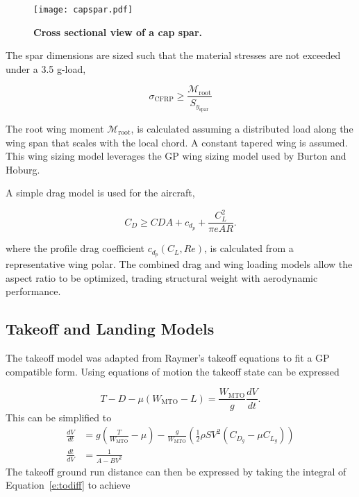 \documentclass[]{aiaa-tc}%
\begin{document}
\begin{figure}[h!]
	\begin{center}
	\texttt{[image: capspar.pdf]}
    \caption{\textbf{Cross sectional view of a cap spar.}}
	\label{f:capspar}
	\end{center}
\end{figure}

The spar dimensions are sized such that the material stresses are not exceeded under a 3.5 g-load,

\begin{equation}
    \sigma_{\mathrm{CFRP}} \geq \frac{\mathcal{M}_{\mathrm{root}}}{S_{y_{\mathrm{spar}}}}
\end{equation}

The root wing moment $\mathcal{M}_{\mathrm{root}}$, is calculated assuming a distributed load along the wing span that scales with the local chord.\cite{bending}
A constant tapered wing is assumed.  
This wing sizing model leverages the GP wing sizing model used by Burton and Hoburg.\cite{burton_solar_2017} 

A simple drag model is used for the aircraft, 

\begin{equation}
    C_D \geq CDA + c_{d_p} + \frac{C_L^2}{\pi e AR}.
\end{equation}

where the profile drag coefficient $c_{d_p}(C_L, Re)$, is calculated from a representative wing polar. 
The combined drag and wing loading models allow the aspect ratio to be optimized, trading structural weight with aerodynamic performance. 

\subsection{Takeoff and Landing Models}
The takeoff model was adapted from Raymer's takeoff equations to fit a GP compatible form.  Using equations of motion the takeoff state can be expressed

\begin{equation}
    T - D - \mu(W_{\mathrm{MTO}} - L) = \frac{W_{\mathrm{MTO}}}{g} \frac{dV}{dt}.
\end{equation}
This can be simplified to 
\begin{align}
    \frac{dV}{dt} &= g \left( \frac{T}{W_{\mathrm{MTO}}} - \mu \right) - \frac{g}{W_{\mathrm{MTO}}} \left( \frac{1}{2} \rho S V^2 (C_{D_g} - \mu C_{L_g})\right) \\
    \label{e:todiff}
    \frac{dt}{dV} &= \frac{1}{A-BV^2}
\end{align}
The takeoff ground run distance can then be expressed by taking the integral of Equation~\ref{e:todiff} to achieve
\end{document}
